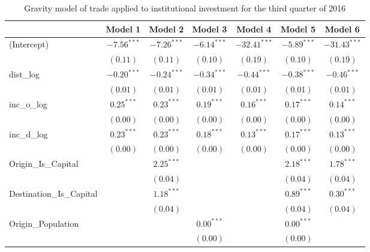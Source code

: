 \begin{table}
	\begin{center}
		\small
		\caption[CGravity Model of Trade for Q3 2016]{Gravity model of trade applied to institutional investment for the third quarter of 2016}
		\begin{tabular}{l c c c c c c }
			\hline
			& Model 1 & Model 2 & Model 3 & Model 4 & Model 5 & Model 6 \\
			\hline
			(Intercept)                  & $-7.56^{***}$ & $-7.26^{***}$ & $-6.14^{***}$ & $-32.41^{***}$ & $-5.89^{***}$ & $-31.43^{***}$ \\
			& $(0.11)$      & $(0.11)$      & $(0.10)$      & $(0.19)$       & $(0.10)$      & $(0.19)$       \\
			dist\_log                    & $-0.20^{***}$ & $-0.24^{***}$ & $-0.34^{***}$ & $-0.44^{***}$  & $-0.38^{***}$ & $-0.46^{***}$  \\
			& $(0.01)$      & $(0.01)$      & $(0.01)$      & $(0.01)$       & $(0.01)$      & $(0.01)$       \\
			inc\_o\_log                  & $0.25^{***}$  & $0.23^{***}$  & $0.19^{***}$  & $0.16^{***}$   & $0.17^{***}$  & $0.14^{***}$   \\
			& $(0.00)$      & $(0.00)$      & $(0.00)$      & $(0.00)$       & $(0.00)$      & $(0.00)$       \\
			inc\_d\_log                  & $0.23^{***}$  & $0.23^{***}$  & $0.18^{***}$  & $0.13^{***}$   & $0.17^{***}$  & $0.13^{***}$   \\
			& $(0.00)$      & $(0.00)$      & $(0.00)$      & $(0.00)$       & $(0.00)$      & $(0.00)$       \\
			Origin\_Is\_Capital          &               & $2.25^{***}$  &               &                & $2.18^{***}$  & $1.78^{***}$   \\
			&               & $(0.04)$      &               &                & $(0.04)$      & $(0.04)$       \\
			Destination\_Is\_Capital     &               & $1.18^{***}$  &               &                & $0.89^{***}$  & $0.30^{***}$   \\
			&               & $(0.04)$      &               &                & $(0.04)$      & $(0.04)$       \\
			Origin\_Population           &               &               & $0.00^{***}$  &                & $0.00^{***}$  &                \\
			&               &               & $(0.00)$      &                & $(0.00)$      &                \\

\end{tabular}
\end{center}
\end{table}
